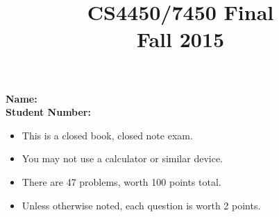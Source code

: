 \documentclass[12pt]{article}
\begin{document}
 
\title{\vspace{10ex}CS4450/7450 Final\\Fall 2015\\ \date{}}


\maketitle
{\Large
\begin{flushleft}
{\bf Name:}\\
{\bf Student Number:}
\end{flushleft}
}
\vfill

\thispagestyle{empty}


{\large
\begin{center}
\begin{minipage}{4.5in}
\begin{itemize}
\item This is a closed book, closed note exam.
\item You may not use a calculator or similar device.
\item There are 47 problems, worth 100 points total.
\item Unless otherwise noted, each question is worth 2 points.
\end{itemize}
\end{minipage}
\end{center}
}

\pagebreak
\end{document}
